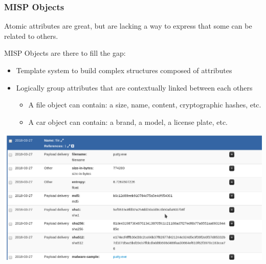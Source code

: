 \begin{frame}
    \frametitle{MISP Objects}
    Atomic attributes are great, but are lacking a way to express that some can be related to others.

    MISP Objects are there to fill the gap:
    \begin{itemize}
        \item Template system to build complex structures composed of attributes
        \item Logically group attributes that are contextually linked between each others
        \begin{itemize}
            \item A file object can contain: a size, name, content, cryptographic hashes, etc.
            \item A car object can contain: a brand, a model, a license plate, etc.
        \end{itemize}
    \end{itemize}
    \includegraphics[scale=1.0]{pictures/object.png}
\end{frame}

